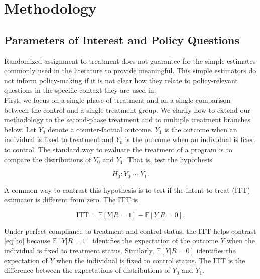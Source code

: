

% 



\section{Methodology} \label{section:methodology}

\subsection{Parameters of Interest and Policy Questions}

\noindent Randomized assignment to treatment does not guarantee for the simple estimates commonly used in the literature to provide meaningful. This simple estimators do not inform policy-making if it is not clear how they relate to policy-relevant questions in the specific context they are used in.\\

\noindent First, we focus on a single phase of treatment and on a single comparison between the control and a single treatment group. We clarify how to extend our methodology to the second-phase treatment and to multiple treatment branches below. Let $Y_{d}$ denote a counter-factual outcome. $Y_{1}$ is the outcome when an individual is fixed to treatment and $Y_{0}$ is the outcome when an individual is fixed to control. The standard way to evaluate the treatment of a program is to compare the distributions of $Y_{0}$ and $Y_{1}$. That is, test the hypothesis 

\begin{equation}
H_{0}: Y_{0} \sim Y_{1}. \label{eq:ho}
\end{equation}

\noindent A common way to contrast this hypothesis is to test if the intent-to-treat (ITT) estimator is different from zero. The ITT is 

\begin{equation}
\text{ITT} = \mathbb{E} \left[ Y | R = 1 \right] - \mathbb{E} \left[ Y | R = 0 \right]. \label{eq:itt}
\end{equation} 

\noindent Under perfect compliance to treatment and control status, the ITT helps contrast \eqref{eq:ho} because $\mathbb{E} \left[ Y | R = 1 \right]$ identifies the expectation of the outcome $Y$ when the individual is fixed to treatment status. Similarly, $\mathbb{E} \left[ Y | R = 0 \right]$ identifies the expectation of $Y$ when the individual is fixed to control status. The ITT is the difference between the expectations of distributions of $Y_{0}$ and $Y_{1}$.

